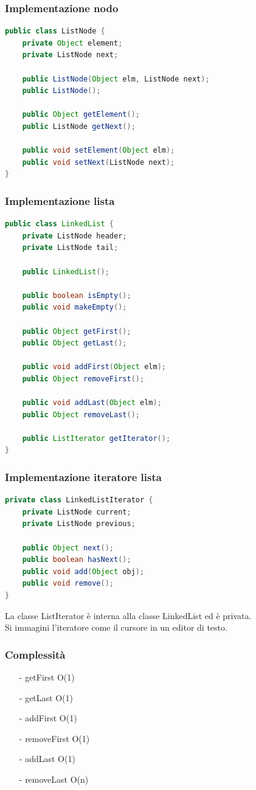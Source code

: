 \documentclass{article}
\begin{document}
\subsubsection*{Implementazione nodo}
\begin{lstlisting}[language=Java]
public class ListNode {
	private Object element;
	private ListNode next;

	public ListNode(Object elm, ListNode next);
	public ListNode();

	public Object getElement();
	public ListNode getNext();

	public void setElement(Object elm);
	public void setNext(ListNode next);
}
\end{lstlisting}

\subsubsection*{Implementazione lista}
\begin{lstlisting}[language=Java]
public class LinkedList {
	private ListNode header;
	private ListNode tail;

	public LinkedList();

	public boolean isEmpty();
	public void makeEmpty();

	public Object getFirst();
	public Object getLast();

	public void addFirst(Object elm);
	public Object removeFirst();

	public void addLast(Object elm);
	public Object removeLast();

	public ListIterator getIterator();
}
\end{lstlisting}

\subsubsection*{Implementazione iteratore lista}
\begin{lstlisting}[language=Java]
private class LinkedListIterator {
	private ListNode current;
	private ListNode previous;

	public Object next();
	public boolean hasNext();
	public void add(Object obj);
	public void remove();
}
\end{lstlisting}
La classe ListIterator è interna alla classe LinkedList ed è privata. \\
Si immagini l'iteratore come il cursore in un editor di testo.

\subsubsection*{Complessità}
\begin{itemize} [topsep=3pt, itemsep=0pt]
	\item[-] getFirst O(1)
	\item[-] getLast O(1)
	\item[-] addFirst O(1)
	\item[-] removeFirst O(1)
	\item[-] addLast O(1)
	\item[-] removeLast O(n)
\end{itemize}
\end{document}
